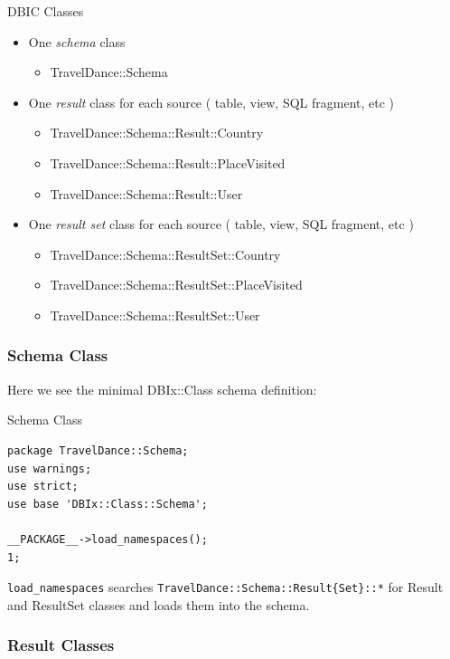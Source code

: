 \begin{frame}{DBIC Classes}
\begin{itemize}
\item One \emph{schema} class
\begin{itemize}
\item TravelDance::Schema
\end{itemize}
\item One \emph{result} class for each source ( table, view, SQL fragment, etc )
\begin{itemize}
\item TravelDance::Schema::Result::Country
\item TravelDance::Schema::Result::PlaceVisited
\item TravelDance::Schema::Result::User
\end{itemize}
\item One \emph{result set} class for each source ( table, view, SQL fragment, etc )
\begin{itemize}
\item TravelDance::Schema::ResultSet::Country
\item TravelDance::Schema::ResultSet::PlaceVisited
\item TravelDance::Schema::ResultSet::User
\end{itemize}
\end{itemize}
\end{frame}

\subsubsection{Schema Class}

Here we see the minimal DBIx::Class schema definition:

\begin{frame}[fragile]{Schema Class}
\begin{lstlisting}
package TravelDance::Schema;
use warnings;
use strict;
use base 'DBIx::Class::Schema';

__PACKAGE__->load_namespaces();
1;
\end{lstlisting}
\end{frame}

\verb|load_namespaces| searches \verb|TravelDance::Schema::Result{Set}::*|
for Result and ResultSet classes and loads them into the schema.

\subsubsection{Result Classes}

